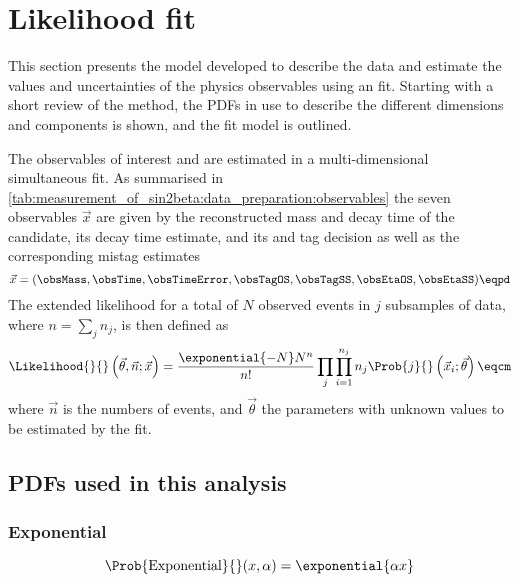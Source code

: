 
\section{Likelihood fit}
\label{sec:measurement_of_sin2beta:likelihood_fit}

This section presents the model developed to describe the data and estimate the
values and uncertainties of the physics observables using an \uEML fit. Starting
with a short review of the \uEML method, the \acp{PDF} in use to describe the
different dimensions and components is shown, and the fit model is outlined.

The \CP observables of interest \SJpsiKS and \CJpsiKS are estimated in a
multi-dimensional simultaneous \uEML fit. As summarised in
\cref{tab:measurement_of_sin2beta:data_preparation:observables} the seven
observables $\vec{x}$ are given by the reconstructed mass and decay time of the
\Bd candidate, its decay time estimate, and its \OS and \SSpi tag decision as
well as the corresponding mistag estimates
%
\begin{equation}\label{eq:measurement_of_sin2beta:likelihood_fit:observables}
  \vec{x} = (\obsMass, \obsTime, \obsTimeError, \obsTagOS, \obsTagSS, \obsEtaOS, \obsEtaSS)\eqpd  
\end{equation}
%
The extended likelihood for a total of $N$ observed events in $j$ subsamples of
data, where $n=\sum_j n_j$, is then defined as
%
\begin{equation}\label{sec:measurement_of_sin2beta:likelihood_fit:uEML}
  \Likelihood{}{}\left(\vec{\theta},\vec{n};\vec{x}\right) = \frac{\exponential{-N} N^n}{n!} \prod_j \prod_{i=1}^{n_j} n_j \Prob{j}{}\left(\vec{x}_i;\vec{\theta}\right)\eqcm
\end{equation}
%
where $\vec{n}$ is the numbers of events, and $\vec{\theta}$ the parameters with
unknown values to be estimated by the \uEML fit. 

\subsection{\acp{PDF} used in this analysis}
\label{sec:measurement_of_sin2beta:likelihood_fit:pdfs}

\subsubsection{Exponential}
\begin{equation}
  \Prob{\text{Exponential}}{}(x, \alpha) = \exponential{\alpha x}
\end{equation}

